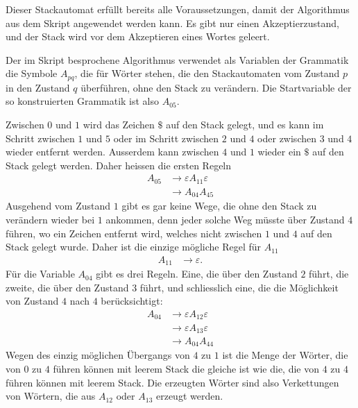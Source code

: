 \begin{loesung}
Dieser Stackautomat erfüllt bereits alle Voraussetzungen, damit
der Algorithmus aus dem Skript angewendet werden kann. Es gibt nur
einen Akzeptierzustand, und der Stack wird vor dem Akzeptieren
eines Wortes geleert.

Der im Skript besprochene Algorithmus verwendet als Variablen der
Grammatik die Symbole $A_{pq}$, die für Wörter stehen, die den
Stackautomaten vom Zustand $p$ in den Zustand $q$ überführen, ohne
den Stack zu verändern. Die Startvariable der so konstruierten Grammatik
ist also $A_{05}$.

Zwischen $0$ und $1$ wird das Zeichen $\texttt{\$}$ auf den Stack gelegt,
und es kann im Schritt zwischen $1$ und $5$ oder im Schritt zwischen $2$
und $4$ oder zwischen $3$ und $4$ wieder entfernt werden. Ausserdem
kann zwischen $4$ und $1$ wieder ein $\texttt{\$}$ auf den Stack gelegt
werden. Daher heissen die ersten Regeln
\begin{align*}
A_{05}&\to \varepsilon A_{11}\varepsilon \\
      &\to A_{04}A_{45}
\end{align*}
Ausgehend vom Zustand $1$ gibt es gar keine Wege, die ohne den Stack zu
verändern wieder bei $1$ ankommen, denn jeder solche Weg müsste über
Zustand $4$ führen, wo ein Zeichen entfernt wird, welches nicht zwischen
$1$ und $4$ auf den Stack gelegt wurde. Daher ist die einzige mögliche
Regel für $A_{11}$
\begin{align*}
A_{11}&\to\varepsilon.
\end{align*}
Für die Variable $A_{04}$ gibt es drei Regeln. Eine, die über den
Zustand $2$ führt, die zweite, die über den Zustand $3$ führt, und
schliesslich eine, die die Möglichkeit von Zustand $4$ nach $4$ 
berücksichtigt:
\begin{equation}
\begin{aligned}
A_{04}&\to \varepsilon A_{12}\varepsilon\\
      &\to \varepsilon A_{13}\varepsilon\\
      &\to A_{04}A_{44}
\end{aligned}
\label{40000041:a04}
\end{equation}
Wegen des einzig möglichen Übergangs von $4$ zu $1$ ist die Menge der
Wörter, die von $0$ zu $4$ führen können mit leerem Stack die gleiche
ist wie die, die von $4$ zu $4$ führen können mit leerem Stack.
Die erzeugten Wörter sind also Verkettungen von Wörtern, die
aus $A_{12}$ oder $A_{13}$ erzeugt werden.


\end{loesung}
